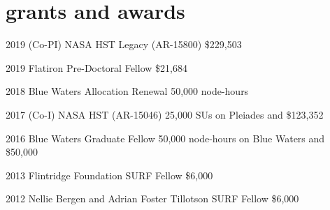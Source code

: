 \documentclass[]{luger-cv} %
\begin{document}

\section{grants and awards}

\begin{entrylist}

\entry
{2019}
{(Co-PI) NASA HST Legacy (AR-15800)}
{\$229,503}
{%
\vspace*{-0.75em}
}

\entry
{2019}
{Flatiron Pre-Doctoral Fellow}
{\$21,684}
{%
\vspace*{-0.75em}
}


\entry
{2018}
{Blue Waters Allocation Renewal}
{50,000 node-hours}
{%
\vspace*{-0.75em}
}


\entry
{2017}
{(Co-I) NASA HST (AR-15046)}
{25,000 SUs on Pleiades and \$123,352}
{%
\vspace*{-0.75em}
}


\entry
{2016}
{Blue Waters Graduate Fellow}
{50,000 node-hours on Blue Waters and \$50,000}
{%
\vspace*{-0.75em}
}


\ifdefined \onepage \else
\entry
{2013}
{Flintridge Foundation SURF Fellow}
{\$6,000}
{%
\vspace*{-0.75em}}

\entry
{2012}
{Nellie Bergen and Adrian Foster Tillotson SURF Fellow}
{\$6,000}
{\vspace*{-0.75em}}
\fi


\end{entrylist}

\end{document}
